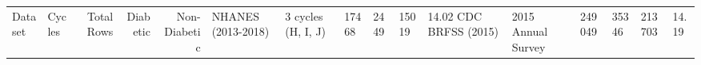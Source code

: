 \begin{tabular}{llrrrllll}
\toprule
Dataset & Cycles & Total Rows & Diabetic & Non-Diabetic & %
\midrule
NHANES (2013-2018) & 3 cycles (H, I, J) & 17468 & 2449 & 15019 & 14.02%
CDC BRFSS (2015) & 2015 Annual Survey & 249049 & 35346 & 213703 & 14.19%
\bottomrule
\end{tabular}
